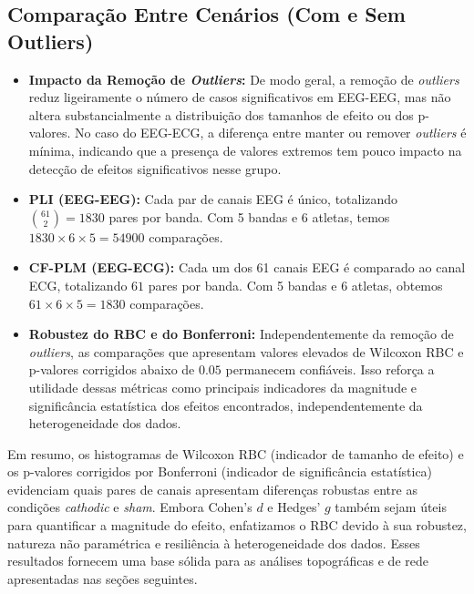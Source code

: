 \subsection{Comparação Entre Cenários (Com e Sem Outliers)}
\begin{itemize}
    \item \textbf{Impacto da Remoção de \textit{Outliers}:} De modo geral, a remoção de \textit{outliers} reduz ligeiramente o número de casos significativos em EEG-EEG, mas não altera substancialmente a distribuição dos tamanhos de efeito ou dos p-valores. No caso do EEG-ECG, a diferença entre manter ou remover \textit{outliers} é mínima, indicando que a presença de valores extremos tem pouco impacto na detecção de efeitos significativos nesse grupo.
    \item \textbf{PLI (EEG-EEG):} Cada par de canais EEG é único, totalizando \(\binom{61}{2}=1830\) pares por banda. Com 5 bandas e 6 atletas, temos \(1830\times6\times5=54900\) comparações.
    \item \textbf{CF-PLM (EEG-ECG):} Cada um dos 61 canais EEG é comparado ao canal ECG, totalizando \(61\) pares por banda. Com 5 bandas e 6 atletas, obtemos \(61\times6\times5=1830\) comparações.
    \item \textbf{Robustez do RBC e do Bonferroni:} Independentemente da remoção de \textit{outliers}, as comparações que apresentam valores elevados de Wilcoxon RBC e p-valores corrigidos abaixo de \( 0.05 \) permanecem confiáveis. Isso reforça a utilidade dessas métricas como principais indicadores da magnitude e significância estatística dos efeitos encontrados, independentemente da heterogeneidade dos dados.
\end{itemize}

Em resumo, os histogramas de Wilcoxon RBC (indicador de tamanho de efeito) e os p-valores corrigidos por Bonferroni (indicador de significância estatística) evidenciam quais pares de canais apresentam diferenças robustas entre as condições \textit{cathodic} e \textit{sham}. Embora Cohen's \(d\) e Hedges' \(g\)  também sejam úteis para quantificar a magnitude do efeito, enfatizamos o RBC devido à sua robustez, natureza não paramétrica e resiliência à heterogeneidade dos dados. Esses resultados fornecem uma base sólida para as análises topográficas e de rede apresentadas nas seções seguintes.

